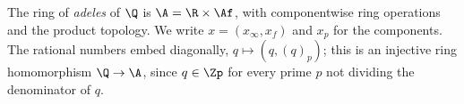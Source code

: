The ring of \emph{adeles} of $\Q$ is $\A=\R\times\Af$, with componentwise ring operations and the product topology. We
write $x=(x_\infty,x_f)$ and $x_p$ for the components. The rational numbers embed diagonally,
$q\mapsto(q,(q)_p)$; this is an injective ring homomorphism $\Q\to\A$, since $q\in\Zp$ for every prime $p$ not dividing
the denominator of $q$.
